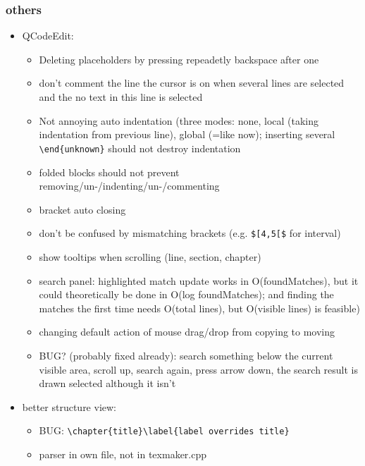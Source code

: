 \documentclass[10pt,a4paper,landscape]{report}
\begin{document}
\subsubsection{others}
\begin{itemize}
	\item QCodeEdit: \begin{itemize}
		\item Deleting placeholders by pressing repeadetly backspace after one
		\item don't comment the line the cursor is on when several lines are selected and the no text in this line is selected
		\item Not annoying auto indentation (three modes: none, local (taking indentation from previous line), global (=like now); inserting several \verb+ \end{unknown}+ should not destroy indentation
		\item folded blocks should not prevent removing/un-/indenting/un-/commenting
		\item bracket auto closing
		\item don't be confused by mismatching brackets (e.g. \verb+$[4,5[$+ for interval)
%
%
%
%
		\item show tooltips when scrolling (line, section, chapter)
		\item search panel: highlighted match update works in O(foundMatches), but it could theoretically be done in O(log foundMatches);
		and finding the matches the first time needs O(total lines), but O(visible lines) is feasible)
		\item changing default action of mouse drag/drop from copying to moving
		\item BUG? (probably fixed already): 
		search something below the current visible area, scroll up, search again, press arrow down, the search result is drawn selected although it isn't
	\end{itemize}
	\item better structure view: \begin{itemize}
		\item BUG: \verb+\chapter{title}\label{label overrides title}+
		\item parser in own file, not in texmaker.cpp

\end{itemize}
\end{itemize}
\end{document}
